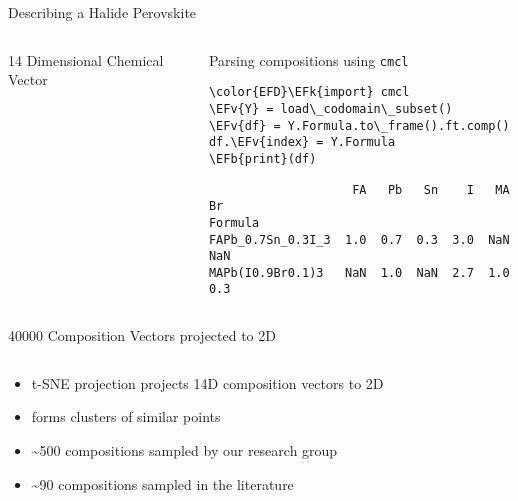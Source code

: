 \documentclass[10pt, aspectratio=169, presentation]{beamer}
\newcommand{\EFk}[1]{\textcolor{EFk}{#1}} %
\newcommand{\EFb}[1]{\textcolor{EFb}{#1}} %
\newcommand{\EFv}[1]{\textcolor{EFv}{#1}} %
\begin{document}
\begin{frame}[label={sec:org0e9f8a0},fragile]{Describing a Halide Perovskite}
 \begin{columns}
\begin{column}{0.4\columnwidth}
\begin{block}{14 Dimensional Chemical Vector}
 
\begin{center}

\end{center}
\end{block}
\end{column}

\begin{column}{0.6\columnwidth}
\begin{block}{Parsing compositions using \texttt{cmcl}}
\begin{Code}
\begin{Verbatim}
\color{EFD}\EFk{import} cmcl
\EFv{Y} = load\_codomain\_subset()
\EFv{df} = Y.Formula.to\_frame().ft.comp()
df.\EFv{index} = Y.Formula
\EFb{print}(df)
\end{Verbatim}
\end{Code}

\begin{small}
\begin{verbatim}
                    FA   Pb   Sn    I   MA   Br
Formula                                        
FAPb_0.7Sn_0.3I_3  1.0  0.7  0.3  3.0  NaN  NaN
MAPb(I0.9Br0.1)3   NaN  1.0  NaN  2.7  1.0  0.3
\end{verbatim}
\end{small}
\end{block}
\end{column}
\end{columns}
\end{frame}

\begin{frame}[label={sec:org3c59447}]{40000 Composition Vectors projected to 2D}
\begin{columns}
\begin{column}{0.4\columnwidth}
\begin{itemize}
\item t-SNE projection projects 14D composition vectors to 2D
\item forms clusters of similar points
\item \textasciitilde{}500 compositions sampled by our research group
\autocite{yang-2023-high-throug}
\item \textasciitilde{}90 compositions sampled in the literature
\autocite{almora-2020-devic-perfor}
\end{itemize}
\end{column}

\begin{column}{0.6\columnwidth}
 
\begin{center}

\end{center}
\end{column}
\end{columns}
\end{frame}
\end{document}
